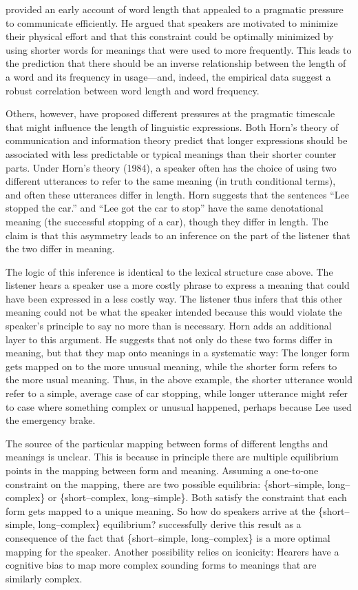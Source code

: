  provided an early account of word length that appealed to a pragmatic pressure to communicate efficiently. He argued that speakers are motivated to minimize their physical effort and that this constraint could be optimally minimized by using shorter words for meanings that were used to more frequently. This leads to the prediction that there should be an inverse relationship between the length of a word and its frequency in usage---and, indeed, the empirical data suggest a robust correlation between word length and word frequency.

Others, however, have proposed different pressures at the pragmatic timescale that might influence the length of linguistic expressions. Both Horn's theory of communication and information theory predict that longer expressions should be associated with less predictable or typical meanings than their shorter counter parts. Under Horn's theory (1984), a speaker often has the choice of using two different utterances to refer to the same meaning (in truth conditional terms), and often these utterances differ in length. Horn suggests that the sentences ``Lee stopped the car.'' and ``Lee got the car to stop'' have the same denotational meaning (the successful stopping of a car), though they differ in length. The claim is that this asymmetry leads to an inference on the part of the listener that the two differ in meaning.

The logic of this inference is identical to the lexical structure case above. The listener hears a speaker use a more costly phrase to express a meaning that could have been expressed in a less costly way. The listener thus infers that this other meaning could not be what the speaker intended because this would violate the speaker's principle to say no more than is necessary. Horn adds an additional layer to this argument. He suggests that not only do these two forms differ in meaning, but that they map onto meanings in a systematic way: The longer form gets mapped on to the more unusual meaning, while the shorter form refers to the more usual meaning. Thus, in the above example, the shorter utterance would refer to a simple, average case of car stopping, while longer utterance might refer to case where something complex or unusual happened, perhaps because Lee used the emergency brake.

The source of the particular mapping between forms of different lengths and meanings is unclear. This is because in principle there are multiple equilibrium points in the mapping between form and meaning. Assuming a one-to-one constraint on the mapping, there are two possible equilibria: \{short--simple, long--complex\} or \{short--complex, long--simple\}. Both satisfy the constraint that each form gets mapped to a unique meaning. So how do speakers arrive at the \{short--simple, long--complex\} equilibrium?  successfully derive this result as a consequence of the fact that \{short--simple, long--complex\} is a more optimal mapping for the speaker. Another possibility relies on iconicity: Hearers have a cognitive bias to map more complex sounding forms to meanings that are similarly complex.

